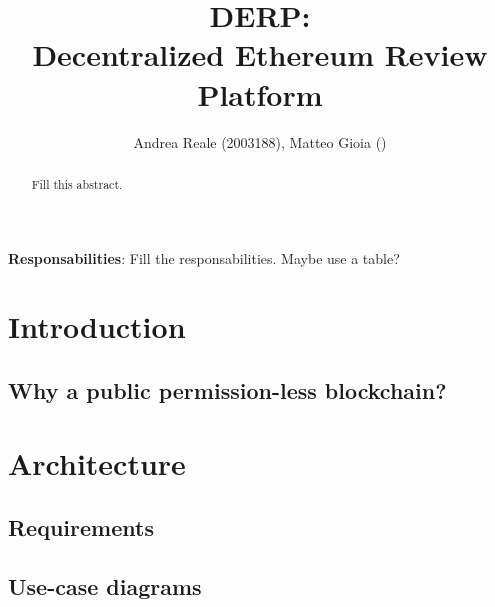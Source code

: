 \documentclass{bc}
\begin{document}
\author{Andrea Reale (2003188), Matteo Gioia ()}
\title{DERP: \\ Decentralized Ethereum Review Platform}
\date{}
\maketitle{}

\begin{abstract}
	Fill this abstract.
\end{abstract}

\begin{center}
	\textbf{Responsabilities}: Fill the responsabilities. Maybe use a table?
\end{center}

\tableofcontents
\newpage


\section{Introduction}

\subsection{Why a public permission-less blockchain?}

\section{Architecture}



\subsection{Requirements}


\subsection{Use-case diagrams}
\end{document}
